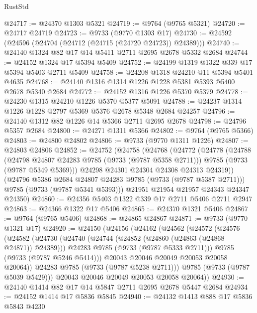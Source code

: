 \begin{lexlean}{RustStd}
\begin{coremodule}
@24717 := @24370 @1303 @5321
@24719 := @9764 (@9765 @5321)
@24720 := @24717 @24719
@24723 := @9733 (@9770 @1303 @17)
@24730 := @24592 (@24596 (@24704 (@24712 (@24715 (@24720 @24723)) @24389)))
@24740 := @24140 @1324 @82 @17 @14 @5411 @2711 @2695 @2678 @5332 @2684
@24744 := @24152 @1324 @17 @5394 @5409
@24752 := @24199 @1319 @1322 @339 @17 @5394 @5403 @2711 @5409
@24758 := @24208 @1318 @24210 @11 @5394 @5401 @4635
@24768 := @24140 @1316 @1314 @1226 @1228 @5381 @5393 @5400 @2678 @5340 @2684
@24772 := @24152 @1316 @1226 @5370 @5379
@24778 := @24230 @1315 @24210 @1226 @5370 @5377 @5091
@24788 := @24237 @1314 @1226 @1228 @2797 @5369 @5376 @2678 @5348 @2684 @24257
@24796 := @24140 @1312 @82 @1226 @14 @5366 @2711 @2695 @2678
@24798 := @24796 @5357 @2684
@24800 := @24271 @1311 @5366
@24802 := @9764 (@9765 @5366)
@24803 := @24800 @24802
@24806 := @9733 (@9770 @1311 @1226)
@24807 := @24803 @24806
@24852 := @24752
    (@24758
      (@24768
        (@24772
          (@24778
            (@24788
              (@24798 @24807 @24283 @9785 (@9733 (@9787 @5358 @2711)))
              @9785
              (@9733 (@9787 @5349 @5369)))
            @24298
            @24301
            @24304
            @24308
            @24313
            @24319))
        (@24796 @5386 @2684 @24807 @24283 @9785 (@9733 (@9787 @5387 @2711)))
        @9785
        (@9733 (@9787 @5341 @5393)))
      @21951
      @21954
      @21957
      @24343
      @24347
      @24350)
@24860 := @24356 @5403 @1322 @339 @17 @2711 @5406 @2711 @2947
@24863 := @24366 @1322 @17 @5406
@24865 := @24370 @1321 @5406
@24867 := @9764 (@9765 @5406)
@24868 := @24865 @24867
@24871 := @9733 (@9770 @1321 @17)
@24920 := @24150
    (@24156
      (@24162
        (@24562
          (@24572
            (@24576
              (@24582
                (@24730
                  (@24740
                    (@24744 (@24852 (@24860 (@24863 (@24868 @24871)) @24389)))
                    @24283
                    @9785
                    (@9733 (@9787 @5333 @2711)))
                  @9785
                  (@9733 (@9787 @5246 @5414)))
                @20043
                @20046
                @20049
                @20053
                @20058
                @20064))
            @24283
            @9785
            (@9733 (@9787 @5238 @2711)))
          @9785
          (@9733 (@9787 @5039 @5429)))
        @20043
        @20046
        @20049
        @20053
        @20058
        @20064))
@24930 := @24140 @1414 @82 @17 @14 @5847 @2711 @2695 @2678 @5447 @2684
@24934 := @24152 @1414 @17 @5836 @5845
@24940 := @24132 @1413 @888 @17 @5836 @5843 @4230

\end{coremodule}
\end{lexlean}
